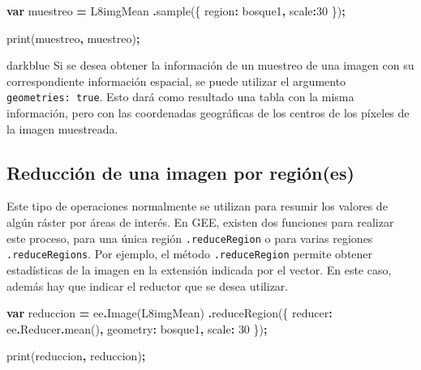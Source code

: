 \documentclass[
  12pt,
  letterpaper,
  twoside]{book}
\newenvironment{Shaded}{\begin{snugshade}}{\end{snugshade}}
\newcommand{\AttributeTok}[1]{\textcolor[rgb]{0.77,0.63,0.00}{#1}}
\newcommand{\DataTypeTok}[1]{\textcolor[rgb]{0.13,0.29,0.53}{#1}}
\newcommand{\DecValTok}[1]{\textcolor[rgb]{0.00,0.00,0.81}{#1}}
\newcommand{\FunctionTok}[1]{\textcolor[rgb]{0.00,0.00,0.00}{#1}}
\newcommand{\KeywordTok}[1]{\textcolor[rgb]{0.13,0.29,0.53}{\textbf{#1}}}
\newcommand{\NormalTok}[1]{#1}
\newcommand{\OperatorTok}[1]{\textcolor[rgb]{0.81,0.36,0.00}{\textbf{#1}}}
\newcommand{\StringTok}[1]{\textcolor[rgb]{0.31,0.60,0.02}{#1}}
\begin{document}
\begin{Shaded}
\begin{Highlighting}[]
\KeywordTok{var}\NormalTok{ muestreo }\OperatorTok{=}\NormalTok{ L8imgMean}
  \OperatorTok{.}\FunctionTok{sample}\NormalTok{(\{}
    \DataTypeTok{region}\OperatorTok{:}\NormalTok{ bosque1}\OperatorTok{,}
    \DataTypeTok{scale}\OperatorTok{:}\DecValTok{30}
\NormalTok{  \})}\OperatorTok{;}

\FunctionTok{print}\NormalTok{(muestreo}\OperatorTok{,} \StringTok{\textquotesingle{}muestreo\textquotesingle{}}\NormalTok{)}\OperatorTok{;}
\end{Highlighting}
\end{Shaded}

\begin{bluebox2}

\begin{awesomeblock}{5pt}{\faLightbulb}{darkblue}
Si se desea obtener la información de un muestreo de una imagen con su correspondiente información espacial, se puede utilizar el argumento \texttt{geometries:\ true}. Esto dará como resultado una tabla con la misma información, pero con las coordenadas geográficas de los centros de los píxeles de la imagen muestreada.

\end{awesomeblock}

\end{bluebox2}

\hypertarget{reducciuxf3n-de-una-imagen-por-regiuxf3nes}{%
\subsection{Reducción de una imagen por región(es)}\label{reducciuxf3n-de-una-imagen-por-regiuxf3nes}}

Este tipo de operaciones normalmente se utilizan para resumir los valores de algún ráster por áreas de interés. En GEE, existen dos funciones para realizar este proceso, para una única región \texttt{.reduceRegion} o para varias regiones \texttt{.reduceRegions}. Por ejemplo, el método \texttt{.reduceRegion} permite obtener estadísticas de la imagen en la extensión indicada por el vector. En este caso, además hay que indicar el reductor que se desea utilizar.

\begin{Shaded}
\begin{Highlighting}[]
\KeywordTok{var}\NormalTok{ reduccion }\OperatorTok{=}\NormalTok{ ee}\OperatorTok{.}\FunctionTok{Image}\NormalTok{(L8imgMean)}
  \OperatorTok{.}\FunctionTok{reduceRegion}\NormalTok{(\{}
    \DataTypeTok{reducer}\OperatorTok{:}\NormalTok{ ee}\OperatorTok{.}\AttributeTok{Reducer}\OperatorTok{.}\FunctionTok{mean}\NormalTok{()}\OperatorTok{,}
    \DataTypeTok{geometry}\OperatorTok{:}\NormalTok{ bosque1}\OperatorTok{,}
    \DataTypeTok{scale}\OperatorTok{:} \DecValTok{30}
\NormalTok{  \})}\OperatorTok{;}
  
\FunctionTok{print}\NormalTok{(reduccion}\OperatorTok{,} \StringTok{\textquotesingle{}reduccion\textquotesingle{}}\NormalTok{)}\OperatorTok{;}
\end{Highlighting}
\end{Shaded}
\end{document}
